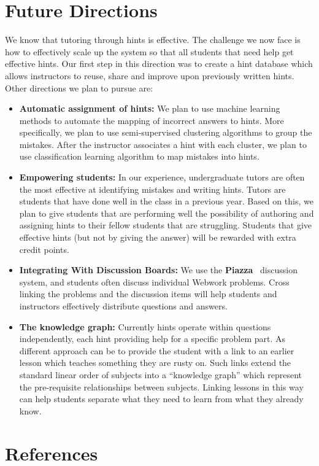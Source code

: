 \documentclass{sigchi}
\begin{document}
\section{Future Directions}
We know that tutoring through hints is effective. The challenge we now
face is how to effectively scale up the system so that all students
that need help get effective hints. Our first step in this direction
was to create a hint database which allows instructors to reuse, share
and improve upon previously written hints. Other directions we plan to
pursue are:
\begin{itemize}
\item {\bf Automatic assignment of hints:} We plan to use machine
  learning methods to automate the mapping of incorrect answers to
  hints. More specifically, we plan to use semi-supervised clustering
  algorithms to group the mistakes. After the instructor associates a
  hint with each cluster, we plan to use classification learning
  algorithm to map mistakes into hints.
\item {\bf Empowering students:} In our experience, undergraduate
  tutors are often the most effective at identifying mistakes and
  writing hints. Tutors are students that have done well in the class
  in a previous year. Based on this, we plan to give students that are
  performing well the possibility of authoring and assigning hints to
  their fellow students that are struggling. Students that give
  effective hints (but not by giving the answer) will be rewarded with
  extra credit points. 
\item {\bf Integrating With Discussion Boards:} We use the {\bf
  Piazza}~\cite{Piazza} discussion system, and students often discuss
  individual Webwork problems. Cross linking the problems and the
  discussion items will help students and instructors effectively
  distribute questions and answers.
\item {\bf The knowledge graph:} Currently hints operate within
  questions independently, each hint providing help for a specific
  problem part. As different approach can be to provide the student
  with a link to an earlier lesson which teaches something they are
  rusty on. Such links extend the standard linear order of subjects
  into a ``knowledge graph'' which represent the pre-requisite
  relationships between subjects. Linking lessons in this way can help
  students separate what they need to learn from what they already
  know.
\end{itemize}

\section{References}



\end{document}
